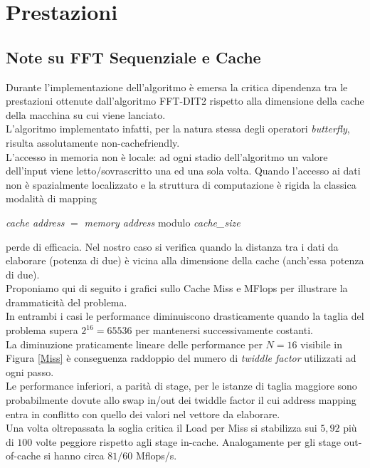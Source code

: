 \documentclass[12pt,a4paper,oneside,openright]{article}
\begin{document}
\section{Prestazioni}
\subsection{Note su FFT Sequenziale e Cache}
Durante l'implementazione dell'algoritmo è emersa la critica dipendenza tra le prestazioni ottenute dall'algoritmo FFT-DIT2 rispetto alla dimensione della cache della macchina su cui viene lanciato.\\
L'algoritmo implementato infatti, per la natura stessa degli operatori \emph{butterfly}, risulta assolutamente non-cachefriendly.\\
L'accesso in memoria non è locale: ad ogni stadio dell'algoritmo un valore dell'input viene letto/sovrascritto una ed una sola volta. Quando l'accesso ai dati non è spazialmente localizzato e la struttura di computazione è rigida la classica modalità di mapping\\
\begin{center}
\emph{cache address} $=$ \emph{memory address} modulo \emph{cache\_size} 
\end{center}
perde di efficacia. Nel nostro caso si verifica quando la distanza tra i dati da elaborare (potenza di due) è vicina alla dimensione della cache (anch'essa potenza di due).\\
Proponiamo qui di seguito i grafici sullo Cache Miss e MFlops per illustrare la drammaticità del problema.\\
In entrambi i casi le performance diminuiscono drasticamente quando la taglia del problema supera $2^{16}=65536$ per mantenersi successivamente costanti.\\ La diminuzione praticamente lineare delle performance per $N=16$ visibile in Figura \ref{Miss} è conseguenza raddoppio del numero di \emph{twiddle factor} utilizzati ad ogni passo.\\
Le performance inferiori, a parità di stage, per le istanze di taglia maggiore sono probabilmente dovute allo swap in/out dei twiddle factor il cui address mapping entra in conflitto con quello dei valori nel vettore da elaborare.\\
Una volta oltrepassata la soglia critica il Load per Miss si stabilizza sui $5,92$ più di $100$ volte peggiore rispetto agli stage in-cache. 
Analogamente per gli stage out-of-cache si hanno circa $81/60$ Mflops/s.
\end{document}
